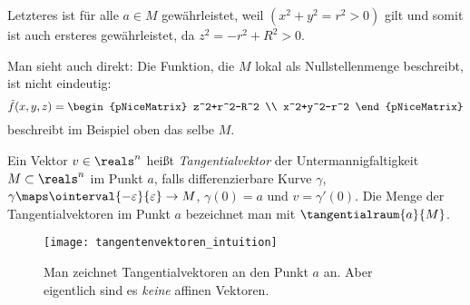 \begin{beispiele*}
\begin{enumerate}
\begin{beispiel*}
      Letzteres ist für alle \( a\in M \) gewährleistet, weil \( (x^2+y^2=r^2>0) \) gilt und somit ist auch ersteres gewährleistet, da \( z^2=-r^2+R^2>0 \).

      Man sieht auch direkt: Die Funktion, die \( M \) lokal als Nullstellenmenge beschreibt, ist nicht eindeutig: \zb
      \begin{equation*}
        \tilde{f}(x,y,z)=\begin{pNiceMatrix} z^2+r^2-R^2 \\ x^2+y^2-r^2 \end{pNiceMatrix}
      \end{equation*}
      beschreibt im Beispiel oben das selbe \( M \).
    \end{beispiel*}
  \end{enumerate}
\end{beispiele*}
\begin{definition}\label{tangentialraum}
  Ein Vektor \( v\in \reals^n \) heißt \emph{Tangentialvektor} der Untermannigfaltigkeit \( M\subset \reals^n \) im Punkt \( a \), falls \texists differenzierbare Kurve \( \gamma \), \( \gamma\maps \ointerval{-\varepsilon}{\varepsilon} \to M\), \sd \( \gamma(0)=a \) und \( v=\gamma'(0) \). Die Menge der Tangentialvektoren im Punkt \( a \) bezeichnet man mit \( \tangentialraum{a}{M} \). 
  \begin{figure}[H]
    \centering
    \texttt{[image: tangentenvektoren\_intuition]}
    \caption*{Man zeichnet Tangentialvektoren an den Punkt \( a \) an. Aber eigentlich sind es \emph{keine} affinen Vektoren.}
    \label{fig:tangentenvektoren_intuition}
  \end{figure}
\end{definition}
